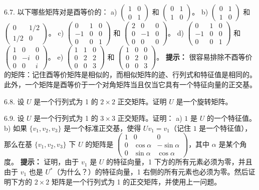 6.7. 以下哪些矩阵对是酉等价的：
a) $\begin{pmatrix} 1 & 0 \\ 0 & 1 \end{pmatrix}$ 和 $\begin{pmatrix} 0 & 1 \\ 1 & 0 \end{pmatrix}$。
b) $\begin{pmatrix} 0 & 1 \\ 1 & 0 \end{pmatrix}$ 和 $\begin{pmatrix} 0 & 1/2 \\ 1/2 & 0 \end{pmatrix}$。
c) $\begin{pmatrix} 0 & 1 & 0 \\ -1 & 0 & 0 \\ 0 & 0 & 1 \end{pmatrix}$ 和 $\begin{pmatrix} 2 & 0 & 0 \\ 0 & -1 & 0 \\ 0 & 0 & 0 \end{pmatrix}$。
d) $\begin{pmatrix} 0 & 1 & 0 \\ -1 & 0 & 0 \\ 0 & 0 & 1 \end{pmatrix}$ 和 $\begin{pmatrix} 1 & 0 & 0 \\ 0 & -i & 0 \\ 0 & 0 & i \end{pmatrix}$。
e) $\begin{pmatrix} 1 & 1 & 0 \\ 0 & 2 & 2 \\ 0 & 0 & 3 \end{pmatrix}$ 和 $\begin{pmatrix} 1 & 0 & 0 \\ 0 & 2 & 0 \\ 0 & 0 & 3 \end{pmatrix}$。
\textbf{提示：} 很容易排除不酉等价的矩阵：记住酉等价矩阵是相似的，而相似矩阵的迹、行列式和特征值是相同的。此外，一个矩阵是酉等价于一个对角矩阵当且仅当它具有一个特征向量的正交基。

6.8. 设 $U$ 是一个行列式为 1 的 $2 \times 2$ 正交矩阵。证明 $U$ 是一个旋转矩阵。

6.9. 设 $U$ 是一个行列式为 1 的 $3 \times 3$ 正交矩阵。证明：
a) $1$ 是 $U$ 的一个特征值。
b) 如果 $\{v_1, v_2, v_3\}$ 是一个标准正交基，使得 $Uv_1 = v_1$（记住 $1$ 是一个特征值），那么在基 $\{v_1, v_2, v_3\}$ 下 $U$ 的矩阵是 $\begin{pmatrix} 1 & 0 & 0 \\ 0 & \cos \alpha & -\sin \alpha \\ 0 & \sin \alpha & \cos \alpha \end{pmatrix}$，其中 $\alpha$ 是某个角度。
\textbf{提示：} 证明，由于 $v_1$ 是 $U$ 的特征向量，1 下方的所有元素必须为零，并且由于 $v_1$ 也是 $U^*$（为什么？）的特征向量，1 右侧的所有元素也必须为零。然后证明下方的 $2 \times 2$ 矩阵是一个行列式为 1 的正交矩阵，并使用上一问题。


